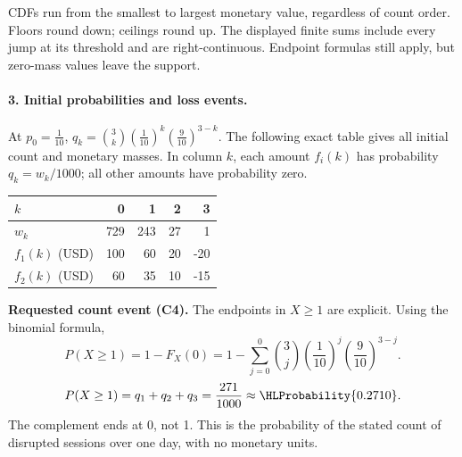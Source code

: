 CDFs run from the smallest to largest monetary value, regardless of count order. Floors round down; ceilings round up. The displayed finite sums include every jump at its threshold and are right-continuous. Endpoint formulas still apply, but zero-mass values leave the support.
\clearpage\paragraph{3. Initial probabilities and loss events.}
At $p_0=\frac{1}{10}$, $q_k=\binom{3}k(\frac{1}{10})^k(\frac{9}{10})^{3-k}$. The following exact table gives all initial count and monetary masses. In column $k$, each amount $f_i(k)$ has probability $q_k=w_k/1000$; all other amounts have probability zero.
\begin{center}\begin{tabular}{lrrrr}\toprule
$k$ & 0 & 1 & 2 & 3\\\midrule
$w_k$ & 729 & 243 & 27 & 1\\
$f_1(k)$ (USD) & 100 & 60 & 20 & -20\\
$f_2(k)$ (USD) & 60 & 35 & 10 & -15\\
\bottomrule\end{tabular}\end{center}
\textbf{Requested count event (C4).} The endpoints in $X\geq 1$ are explicit. Using the binomial formula,
\[P(X\geq 1)=1-F_X(0)=1-\sum_{j=0}^{0}\binom{3}j(\frac{1}{10})^j(\frac{9}{10})^{3-j}.\]
\[P(X\geq 1)=q_{1}+q_{2}+q_{3}=\frac{271}{1000}\approx\HLProbability{0.2710}.\]
The complement ends at 0, not 1.
This is the probability of the stated count of disrupted sessions over one day, with no monetary units.
\clearpage
